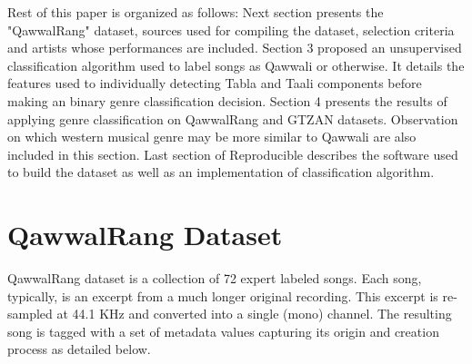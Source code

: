 \documentclass{article}
\begin{document}
Rest of this paper is organized as follows: Next section presents the "QawwalRang" dataset, sources used for compiling the dataset, selection criteria and artists whose performances are included. Section 3 proposed an unsupervised classification algorithm used to label songs as Qawwali or otherwise. It details the features used to individually detecting Tabla and Taali components before making an binary genre classification decision. Section 4 presents the results of applying genre classification on QawwalRang and GTZAN datasets. Observation on which western musical genre may be more similar to Qawwali are also included in this section. Last section of Reproducible describes the software used to build the dataset as well as an implementation of classification algorithm.

\section{QawwalRang Dataset}\label{sec:data}

QawwalRang dataset is a collection of 72 expert labeled songs. Each song, typically, is an excerpt from a much longer original recording. This excerpt is re-sampled at 44.1 KHz and converted into a single (mono) channel. The resulting song is tagged with a set of metadata values capturing its origin and creation process as detailed below. 
\end{document}
